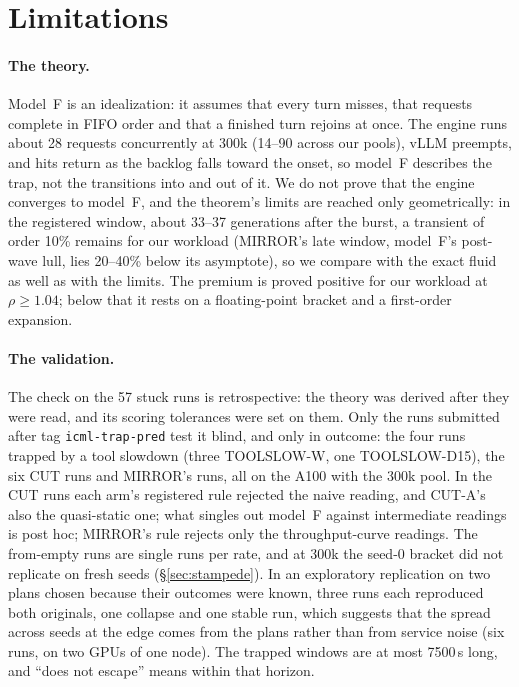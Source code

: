 \section{Limitations}\label{sec:limits}

\paragraph{The theory.} Model~F is an idealization: it assumes that every turn misses, that requests complete in FIFO order and
that a finished turn rejoins at once. The engine runs about 28 requests concurrently at 300k (14--90 across our pools), vLLM preempts, and hits return as the backlog
falls toward the onset, so model~F describes the trap, not the transitions into and out of it. We do not prove that the engine
converges to model~F, and the theorem's limits are reached only geometrically: in the registered window, about 33--37 generations
after the burst, a transient of order 10\% remains for our workload (MIRROR's late window, model~F's post-wave lull, lies 20--40\% below its asymptote), so we compare with the exact fluid as well as with the limits. The premium is
proved positive for our workload at $\rho\ge1.04$; below that it rests on a floating-point bracket and a first-order expansion.

\paragraph{The validation.} The check on the 57 stuck runs is retrospective: the theory was derived after they were read, and its
scoring tolerances were set on them. Only the runs submitted after tag \texttt{icml-trap-pred} test it blind, and only in outcome:
the four runs trapped by a tool slowdown (three TOOLSLOW-W, one TOOLSLOW-D15), the six CUT runs and MIRROR's runs, all on the A100
with the 300k pool. In the CUT runs each arm's registered rule rejected the naive reading, and CUT-A's also the quasi-static one;
what singles out model~F against intermediate readings is post hoc; MIRROR's rule rejects only the throughput-curve readings.
The from-empty runs are single runs per rate, and at 300k the
seed-0 bracket did not replicate on fresh seeds (\S\ref{sec:stampede}). In an exploratory replication on two plans chosen because
their outcomes were known, three runs each reproduced both originals, one collapse and one stable run, which suggests that the spread
across seeds at the edge comes from the plans rather than from service noise (six runs, on two GPUs of one node). The trapped windows
are at most 7500\,s long, and ``does not escape'' means within that horizon.

